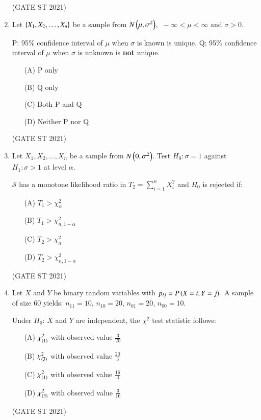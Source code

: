 \documentclass[journal,12pt,onecolumn]{IEEEtran}
\theoremstyle{remark}
\begin{document}
\begin{enumerate}
\hfill (GATE ST 2021) \\

\item
Let $\left\{ X_1, X_2, \dots, X_n \right\}$ be a sample from $N\left(\mu,\sigma^2\right)$, $\ -\infty < \mu < \infty$ and $\sigma > 0$.

P: 95\% confidence interval of $\mu$ when $\sigma$ is known is unique.  
Q: 95\% confidence interval of $\mu$ when $\sigma$ is unknown is \textbf{not} unique.

\begin{enumerate}
\item[(A)] P only
\item[(B)] Q only
\item[(C)] Both P and Q
\item[(D)] Neither P nor Q
\end{enumerate}
\hfill (GATE ST 2021) \\


\item
Let $X_1, X_2, \dots, X_n$ be a sample from $N\left(0,\sigma^2\right)$.  
Test $H_0: \sigma = 1$ against $H_1: \sigma > 1$ at level $\alpha$.

$\mathcal{S}$ has a monotone likelihood ratio in $T_2 = \sum_{i=1}^n X_i^2$ and $H_0$ is rejected if:
\begin{enumerate}
\item[(A)] $T_1 > \chi_\alpha^2$
\item[(B)] $T_1 > \chi_{n,1-\alpha}^2$
\item[(C)] $T_2 > \chi_\alpha^2$
\item[(D)] $T_2 > \chi_{n,1-\alpha}^2$
\end{enumerate}
\hfill (GATE ST 2021) \\


\item
Let $X$ and $Y$ be binary random variables with $p_{ij} = P\left(X = i, Y = j\right)$.  
A sample of size $60$ yields: $n_{11} = 10$, $n_{10} = 20$, $n_{01} = 20$, $n_{00} = 10$.

Under $H_0$: $X$ and $Y$ are independent, the $\chi^2$ test statistic follows:

\begin{enumerate}
\item[(A)] $\chi^2_{\left(1\right)}$ with observed value $\frac{3}{20}$
\item[(B)] $\chi^2_{\left(3\right)}$ with observed value $\frac{20}{3}$
\item[(C)] $\chi^2_{\left(1\right)}$ with observed value $\frac{16}{3}$
\item[(D)] $\chi^2_{\left(3\right)}$ with observed value $\frac{3}{16}$
\end{enumerate}
\hfill (GATE ST 2021) \\



\end{enumerate}
\end{document}
